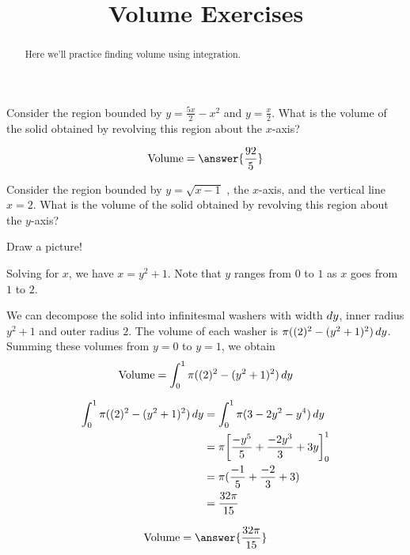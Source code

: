 \documentclass[handout]{ximera}
\title[Exercises:]{Volume Exercises}
\begin{document}
\begin{abstract}
  Here we'll practice finding volume using integration.
\end{abstract}
\maketitle

\begin{problem}
Consider the region bounded by $y = \frac{5x}{2}-x^2$ and
$y=\frac{x}{2}$.  What is the volume of the solid obtained by
revolving this region about the $x$-axis?

  \[
	\textrm{Volume} = \answer{\frac{92}{5}}
	\]

\end{problem}

\begin{exercise}
Consider the region bounded by $y =\sqrt{x-1}$ , the $x$-axis, and the
vertical line $x=2$.  What is the volume of the solid obtained by
revolving this region about the $y$-axis?
\begin{hint}
  Draw a picture!
\end{hint}

\begin{hint}
  Solving for $x$, we have $x = y^2+1$.  Note that $y$ ranges from $0$ to $1$ as $x$ goes from $1$ to $2$.
\end{hint}

\begin{hint}
  We can decompose the solid into infinitesmal washers with width
  $\mathop{}\!d y$, inner radius $y^2+1$ and outer radius $2$.  The volume of each
  washer is $\pi((2)^2 - (y^2+1)^2)\mathop{}\!d y$.  Summing these volumes from
  $y=0$ to $y=1$, we obtain
  \[
  \textrm{Volume} = \int_0^1 \pi((2)^2 - (y^2+1)^2)\mathop{}\!d y
  \]
\end{hint}

\begin{hint}
  \begin{align*}
    \int_0^1\pi((2)^2 - (y^2+1)^2)\mathop{}\!d y &=  \int_0^1 \pi(3-2y^2-y^4)\mathop{}\!d y\\
    &= \pi \bigg[ \frac{-y^5}{5}+\frac{-2y^3}{3}+3y \bigg]_0^1\\
    &=\pi(\frac{-1}{5}+\frac{-2}{3}+3)\\
    &=\frac{32\pi}{15}
  \end{align*}
\end{hint}

  \[
  \textrm{Volume} = \answer{\frac{32\pi}{15}}
  \]

\end{exercise}
\end{document}
